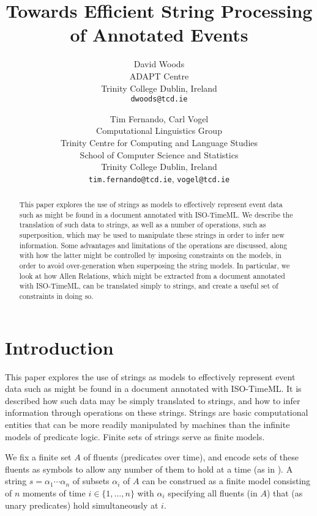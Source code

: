 \documentclass[a4paper,11pt,leqno]{article}
\title{Towards Efficient String Processing of Annotated Events}
\date{}
\author{David Woods\\
	ADAPT Centre\\
	Trinity College Dublin, Ireland\\
	\texttt{dwoods@tcd.ie}
	\and Tim Fernando, Carl Vogel\\
	Computational Linguistics Group \\
	Trinity Centre for Computing and Language Studies\\
	School of Computer Science and Statistics\\
	Trinity College Dublin, Ireland\\
	\texttt{tim.fernando@tcd.ie}, \texttt{vogel@tcd.ie}
}
\begin{document}
\maketitle
\thispagestyle{empty}
\pagestyle{empty}
\begin{abstract}
\noindent
This paper explores the use of strings as models to effectively represent event 
data such as might be found in a document annotated with ISO-TimeML. We 
describe 
the translation of such data to strings, as well as a number of operations, 
such as superposition, which may be used to manipulate these strings in order 
to infer new information. Some advantages and limitations of the operations are 
discussed, along with how the latter might be controlled by imposing 
constraints on the models, in order to avoid over-generation when superposing 
the string models. In particular, we look at how Allen Relations, which might 
be extracted from a document annotated with ISO-TimeML, can be translated 
simply to 
strings, and create a useful set of constraints in doing so.
\end{abstract}
\section{Introduction}\label{intro}
This paper explores the use of strings as models to effectively represent event 
data such as might be found in a document annotated with ISO-TimeML. It is 
described how such data may be simply translated to strings, and how to infer 
information through operations on these strings. Strings are basic 
computational entities that can be more readily manipulated by machines than 
the infinite models of predicate logic. Finite sets of strings serve as finite 
models.

We fix a finite set $A$ of fluents (predicates over time), 
and encode sets of these fluents as symbols to allow any number of them to hold 
at a time (as in \citealp{fernando2016regular}). A string $s=\alpha_1 \cdots 
\alpha_n$ of subsets $\alpha_i$ of $A$ can be construed as a finite model 
consisting of $n$ moments of time $i \in \{1, \ldots, n\}$ with $\alpha_i$ 
specifying all fluents (in $A$) that (as unary predicates) hold simultaneously 
at $i$.
\end{document}
